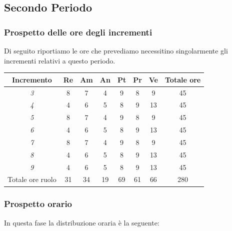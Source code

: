 {{{{{{{{{\subsection{Secondo Periodo}\label{PreventivoFaseDiProgettazioneDiDettaglioECodificaPeriodo2}

\subsubsection{Prospetto delle ore degli incrementi}\label{PreventivoFaseDiProgettazioneDiDettaglioECodificaPeriodo2Incrementi}
Di seguito riportiamo le ore che prevediamo necessitino singolarmente gli incrementi relativi a questo periodo.
\quad
\def\tabularxcolumn#1{m{#1}}
{
	
	\begin{center}
		\renewcommand{\arraystretch}{1.4}
		\begin{tabularx}{\textwidth}{|c|c|c|c|c|c|c|c|}
			\hline
			\rowcolor{airforceblue}
			\textbf{Incremento} & \textbf{Re} & \textbf{Am} & \textbf{An} & \textbf{Pt} & \textbf{Pr} & \textbf{Ve} & \textbf{Totale ore}\\
			\hline
			\textit{3} & 8 & 7 & 4 & 9 & 8 & 9 & 45\\
			\hline
			\textit{4} & 4 & 6 & 5 & 8 & 9 & 13 & 45\\
			\hline
			\textit{5} & 8 & 7 & 4 & 9 & 8 & 9 & 45\\
			\hline
			\textit{6} & 4 & 6 & 5 & 8 & 9 & 13 & 45\\
			\hline
			\textit{7} & 8 & 7 & 4 & 9 & 8 & 9 & 45\\
			\hline
			\textit{8} & 4 & 6 & 5 & 8 & 9 & 13 & 45\\
			\hline
			\textit{9} & 4 & 6 & 5 & 8 & 9 & 13 & 45\\
			\hline
			Totale ore ruolo & 31 & 34 & 19 & 69 & 61 & 66 & 280\\
			\hline
		\end{tabularx}
	\end{center}
	
	\subsubsection{Prospetto orario}\label{PreventivoFaseDiProgettazioneDiDettaglioECodificaProspettoOrarioPeriodo2}
	In questa fase la distribuzione oraria è la seguente:
	\quad
	\def\tabularxcolumn#1{m{#1}}
	{
		
}}}}}}}}}}}
